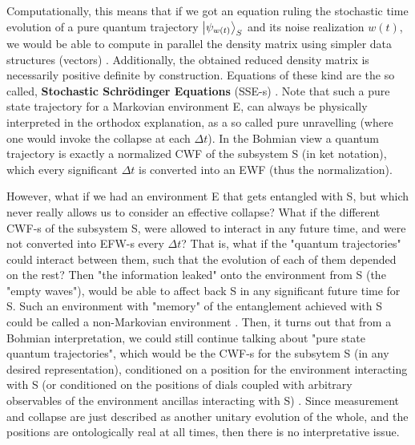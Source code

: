 \documentclass[11pt, a4paper]{article} %
\begin{document}
Computationally, this means that if we got an equation ruling the stochastic time evolution of a pure quantum trajectory $\ket{\psi_{w(t)}}_S$ and its noise realization $w(t)$, we would be able to compute in parallel the density matrix using simpler data structures (vectors) \cite{MarkovianityDefs, QuantumTrajs}. Additionally, the obtained reduced density matrix is necessarily positive definite by construction. Equations of these kind are the so called, {\bf Stochastic Schrödinger Equations} (SSE-s) \cite{Generalized, continousMeas}. Note that such a pure state trajectory for a Markovian environment E, can always be physically interpreted in the orthodox explanation, as a so called pure unravelling \cite{MarkovianityDefs} (where one would invoke the collapse at each $\Delta t$). In the Bohmian view a quantum trajectory is exactly a normalized CWF of the subsystem S (in ket notation), which every significant $\Delta t$ is converted into an EWF (thus the normalization).\vspace{-0.05cm}
 

However, what if we had an environment E that gets entangled with S, but which never really allows us to consider an effective collapse? What if the different CWF-s of the subsystem S, were allowed to interact in any future time, and were not converted into EFW-s every $\Delta t$? That is, what if the "quantum trajectories" could interact between them, such that the evolution of each of them depended on the rest? Then "the information leaked" onto the environment from S (the "empty waves"), would be able to affect back S in any significant future time for S. Such an environment with "memory" of the entanglement achieved with S could be called a non-Markovian environment \cite{MarkovianityDefs}. Then, it turns out that from a Bohmian interpretation, we could still continue talking about "pure state quantum trajectories", which would be the CWF-s for the subsytem S (in any desired representation), conditioned on a position for the environment interacting with S (or conditioned on the positions of dials coupled with arbitrary observables of the environment ancillas interacting with S) \cite{NMisModal, interpretSSE}. Since measurement and collapse are just described as another unitary evolution of the whole, and the positions are ontologically real at all times, then there is no interpretative issue.\vspace{-0.05cm}
\end{document}
